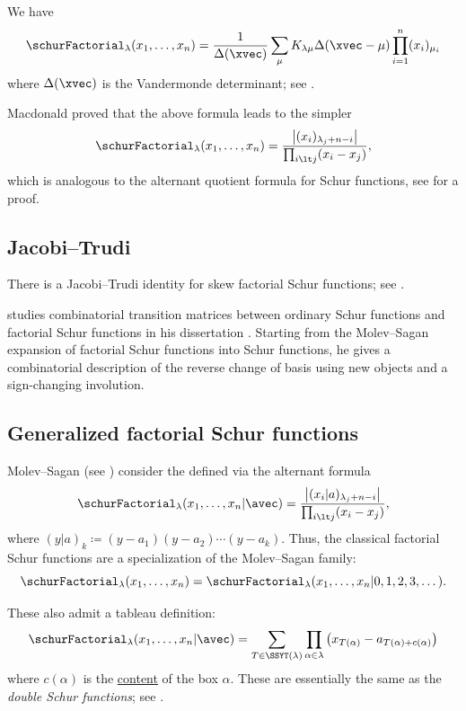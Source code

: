We have
\[
\schurFactorial_{\lambda}(x_1,\dotsc,x_n) =
\frac{1}{\Delta(\xvec)} \sum_{\mu} K_{\lambda \mu} \Delta(\xvec-\mu)
\prod_{i=1}^n (x_i)_{\mu_i}
\]
where $\Delta(\xvec)$ is the Vandermonde determinant; see
\cite[Thm.~5]{BiedenharnLouck1990}.


Macdonald proved that the above formula leads to the simpler 
\[
\schurFactorial_{\lambda}(x_1,\dotsc,x_n) =
\frac{\left| (x_i)_{\lambda_j+n-i} \right| }
{ \prod_{i \lt j} (x_i - x_j) },
\]
which is analogous to the alternant quotient formula for Schur functions,
see \cite[Thm.~3.2]{ChenLouck1993} for a proof.


\subsection[schurFactorialJT]{Jacobi--Trudi}

There is a Jacobi--Trudi identity for skew factorial Schur functions; see
\cite{ChenLouck1993}.

 studies combinatorial transition matrices between
ordinary Schur functions and factorial Schur functions in his dissertation
\cite{Heilman2013}.  Starting from the Molev--Sagan expansion of factorial
Schur functions into Schur functions, he gives a combinatorial description of
the reverse change of basis using new objects and a sign-changing involution.



\subsection[schurFactorialMolevSagan]{Generalized factorial Schur functions}

Molev--Sagan (see \cite{MolevSagan1999}) consider the
\label{generalizedFactorialSchurFunction}
defined via the alternant formula
\[
\schurFactorial_{\lambda}(x_1,\dotsc,x_n | \avec) =
\frac{\left| (x_i|a)_{\lambda_j+n-i} \right|}
{ \prod_{i \lt j} (x_i - x_j) },
\]
where $(y|a)_k \coloneqq (y-a_1)(y-a_2)\dotsm (y-a_k)$.
Thus, the classical factorial Schur functions are a specialization of the
Molev--Sagan family:
\[
\schurFactorial_{\lambda}(x_1,\dotsc,x_n ) = \schurFactorial_{\lambda}(x_1,\dotsc,x_n | 0,1,2,3,\dotsc).
\]

These also admit a tableau definition:
\[
\schurFactorial_{\lambda}(x_1,\dotsc,x_n | \avec) =
\sum_{T \in \SSYT(\lambda)} \prod_{\alpha \in \lambda}
\left( x_{T(\alpha)} - a_{T(\alpha)+c(\alpha)}  \right)
\]
where $c(\alpha)$ is the \hyperref[contentOfBox]{content} of the box $\alpha$.
These are essentially the same as the \emph{double Schur functions}; see
\cite{Molev2009co}.



